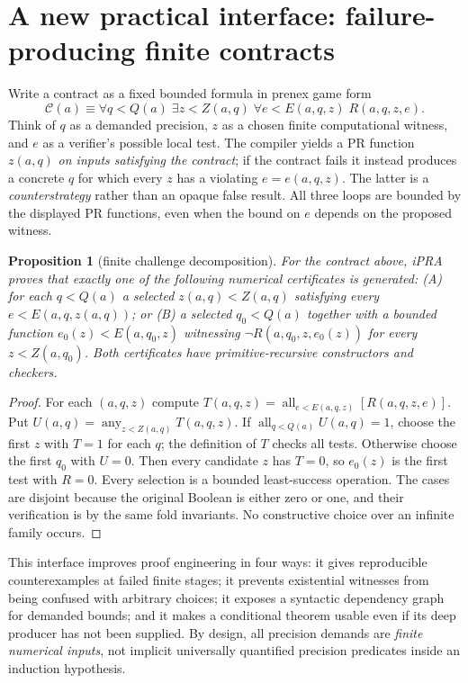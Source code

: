 \documentclass[11pt]{article}
\newtheorem{proposition}[theorem]{Proposition}
\begin{document}
\section{A new practical interface: failure-producing finite contracts}
Write a contract as a fixed bounded formula in prenex game form
\[\mathcal C(a)\equiv \forall q<Q(a)\;\exists z<Z(a,q)\;\forall e<E(a,q,z)\; R(a,q,z,e).\]
Think of $q$ as a demanded precision, $z$ as a chosen finite computational witness, and $e$ as a verifier's possible local test. The compiler yields a PR function $z(a,q)$ \emph{on inputs satisfying the contract}; if the contract fails it instead produces a concrete $q$ for which every $z$ has a violating $e=e(a,q,z)$. The latter is a \emph{counterstrategy} rather than an opaque false result. All three loops are bounded by the displayed PR functions, even when the bound on $e$ depends on the proposed witness.

\begin{proposition}[finite challenge decomposition]\label{challenge}
For the contract above, iPRA proves that exactly one of the following numerical certificates is generated: (A) for each $q<Q(a)$ a selected $z(a,q)<Z(a,q)$ satisfying every $e<E(a,q,z(a,q))$; or (B) a selected $q_0<Q(a)$ together with a bounded function $e_0(z)<E(a,q_0,z)$ witnessing $\neg R(a,q_0,z,e_0(z))$ for every $z<Z(a,q_0)$. Both certificates have primitive-recursive constructors and checkers.
\end{proposition}
\begin{proof}
For each $(a,q,z)$ compute $T(a,q,z)=\operatorname{all}_{e<E(a,q,z)}[R(a,q,z,e)]$. Put $U(a,q)=\operatorname{any}_{z<Z(a,q)}T(a,q,z)$. If $\operatorname{all}_{q<Q(a)}U(a,q)=1$, choose the first $z$ with $T=1$ for each $q$; the definition of $T$ checks all tests. Otherwise choose the first $q_0$ with $U=0$. Then every candidate $z$ has $T=0$, so $e_0(z)$ is the first test with $R=0$. Every selection is a bounded least-success operation. The cases are disjoint because the original Boolean is either zero or one, and their verification is by the same fold invariants. No constructive choice over an infinite family occurs.
\end{proof}

This interface improves proof engineering in four ways: it gives reproducible counterexamples at failed finite stages; it prevents existential witnesses from being confused with arbitrary choices; it exposes a syntactic dependency graph for demanded bounds; and it makes a conditional theorem usable even if its deep producer has not been supplied. By design, all precision demands are \emph{finite numerical inputs}, not implicit universally quantified precision predicates inside an induction hypothesis.
\end{document}

